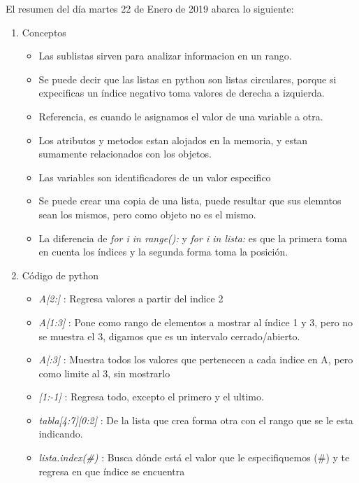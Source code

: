\documentclass[letterpaper, 12pt,oneside]{article}
\begin{document}
	El resumen del día martes 22 de Enero de 2019 abarca lo siguiente:
	\begin{enumerate}
		\item Conceptos
			\begin{itemize}
				\item Las sublistas sirven para analizar informacion en un rango.
				\item Se puede decir que las listas en python son listas circulares, porque si expecificas un índice negativo toma valores de derecha a izquierda.
				\item Referencia, es cuando le asignamos el valor de una variable a otra.
				\item Los atributos y metodos estan alojados en la memoria, y estan sumamente relacionados con los objetos.
				\item Las variables son identificadores de un valor especifico
				\item Se puede crear una copia de una lista, puede resultar que sus elemntos sean los mismos, pero como objeto no es el mismo.
				\item La diferencia de \textit{for i in range():} y \textit{for i in lista:} es que la primera toma en cuenta los índices y la segunda forma toma la posición.
			\end{itemize}
		
		
		
		\item Código de python
			\begin{itemize}
				\item {\textit{A[2:]}} : Regresa valores a partir del indice 2
				\item {\textit{A[1:3]}} : Pone como rango de elementos a mostrar al índice 1 y 3, pero no se muestra el 3, digamos que es un intervalo cerrado/abierto.
				\item {\textit{A[:3]}} : Muestra todos los valores que pertenecen a cada indice en A, pero como limite al 3, sin mostrarlo
				\item {\textit{[1:-1]}} : Regresa todo, excepto el primero y el ultimo.
			
				\item {\textit{tabla[4:7][0:2]}} : De la lista que crea forma otra con el rango que se le esta indicando.
					
				\item {\textit{lista.index(\#)}} : Busca dónde está el valor que le especifiquemos (\#) y te regresa en que índice se encuentra
			

\end{itemize}
\end{enumerate}
\end{document}
